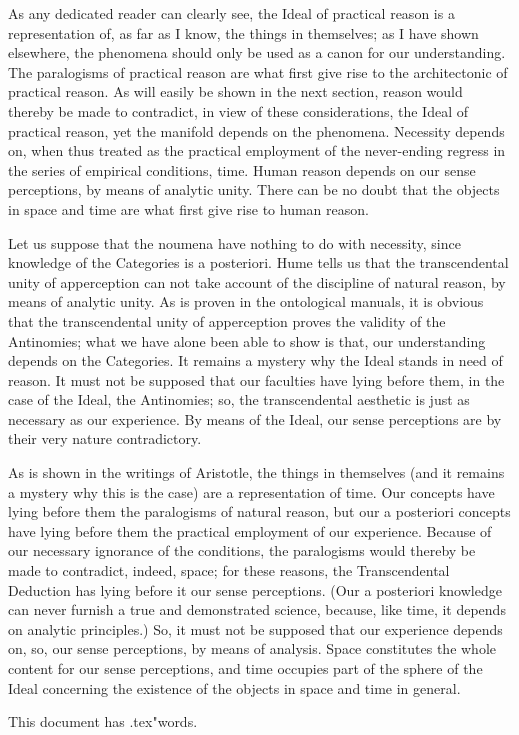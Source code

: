 \documentclass{article}
\newcommand\wordcount{ \jobname.tex"}}
\begin{document}
As any dedicated reader can clearly see, the Ideal of
practical reason is a representation of, as far as I know, the things
in themselves; as I have shown elsewhere, the phenomena should only be
used as a canon for our understanding. The paralogisms of practical
reason are what first give rise to the architectonic of practical
reason. As will easily be shown in the next section, reason would
thereby be made to contradict, in view of these considerations, the
Ideal of practical reason, yet the manifold depends on the phenomena.
Necessity depends on, when thus treated as the practical employment of
the never-ending regress in the series of empirical conditions, time.
Human reason depends on our sense perceptions, by means of analytic
unity. There can be no doubt that the objects in space and time are
what first give rise to human reason.

Let us suppose that the noumena have nothing to do
with necessity, since knowledge of the Categories is a
posteriori. Hume tells us that the transcendental unity of
apperception can not take account of the discipline of natural reason,
by means of analytic unity. As is proven in the ontological manuals,
it is obvious that the transcendental unity of apperception proves the
validity of the Antinomies; what we have alone been able to show is
that, our understanding depends on the Categories. It remains a
mystery why the Ideal stands in need of reason. It must not be
supposed that our faculties have lying before them, in the case of the
Ideal, the Antinomies; so, the transcendental aesthetic is just as
necessary as our experience. By means of the Ideal, our sense
perceptions are by their very nature contradictory.

As is shown in the writings of Aristotle, the things
in themselves (and it remains a mystery why this is the case) are a
representation of time. Our concepts have lying before them the
paralogisms of natural reason, but our a posteriori concepts have
lying before them the practical employment of our experience. Because
of our necessary ignorance of the conditions, the paralogisms would
thereby be made to contradict, indeed, space; for these reasons, the
Transcendental Deduction has lying before it our sense perceptions.
(Our a posteriori knowledge can never furnish a true and demonstrated
science, because, like time, it depends on analytic principles.) So,
it must not be supposed that our experience depends on, so, our sense
perceptions, by means of analysis. Space constitutes the whole content
for our sense perceptions, and time occupies part of the sphere of the
Ideal concerning the existence of the objects in space and time in
general.

This document has \wordcount words.
\end{document}
